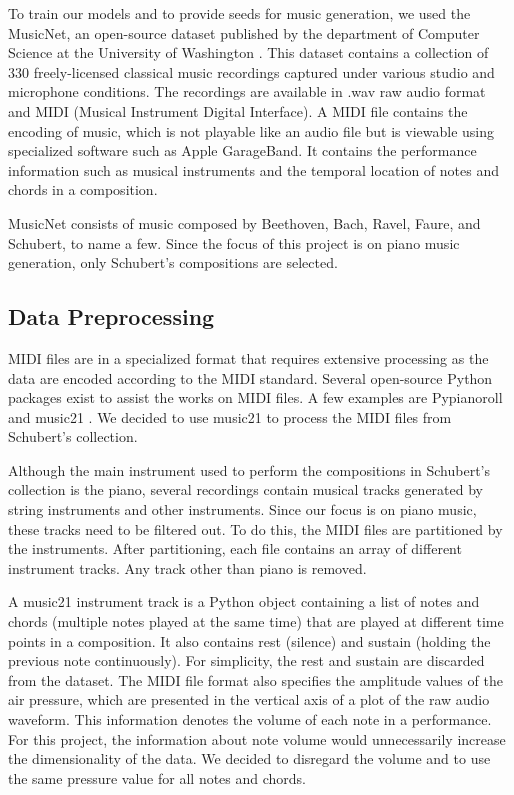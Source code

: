 \documentclass[sigconf,authorversion]{acmart}
\begin{document}
To train our models and to provide seeds for music generation, we used 
the MusicNet, an open-source dataset published by the department of Computer 
Science at the University of Washington \cite{thickstun_learning_2017}. This 
dataset contains a collection of 330 freely-licensed classical music recordings 
captured under various studio and microphone conditions. The recordings are
available in .wav raw audio format and MIDI (Musical Instrument Digital
Interface). A MIDI file contains the encoding of music, which is not playable
like an audio file but is viewable using specialized software such as 
Apple GarageBand. It contains the performance information such as musical
instruments and the temporal location of notes and chords in a composition.

MusicNet consists of music composed by Beethoven, Bach, Ravel, Faure, and Schubert,
to name a few. Since the focus of this project is on piano music generation, only 
Schubert's compositions are selected.

\subsection{Data Preprocessing}

MIDI files are in a specialized format that requires extensive processing as 
the data are encoded according to the MIDI standard. Several open-source Python
packages exist to assist the works on MIDI files. A few examples are Pypianoroll 
\cite{dong_pypianoroll_2018} and music21 \cite{cuthbert_music21_2010}. We
decided to use music21 to process the MIDI files from Schubert's collection.

Although the main instrument used to perform the compositions in Schubert's
collection is the piano, several recordings contain musical tracks generated by 
string instruments and other instruments. Since our focus is on piano music,
these tracks need to be filtered out. To do this, the MIDI files are partitioned 
by the instruments. After partitioning, each file contains an array of different
instrument tracks. Any track other than piano is removed. 

A music21 instrument track is a Python object containing a list of notes and chords
(multiple notes played at the same time) that are played at different time points in 
a composition. It also contains rest (silence) and sustain (holding the
previous note continuously). For simplicity, the rest and sustain are discarded
from the dataset. The MIDI file format also specifies the amplitude values of 
the air pressure, which are presented in the vertical axis of a plot of the raw 
audio waveform. This information denotes the volume of each note in a performance.
For this project, the information about note volume would unnecessarily increase the 
dimensionality of the data. We decided to disregard the volume and to use the same 
pressure value for all notes and chords. 
\end{document}
